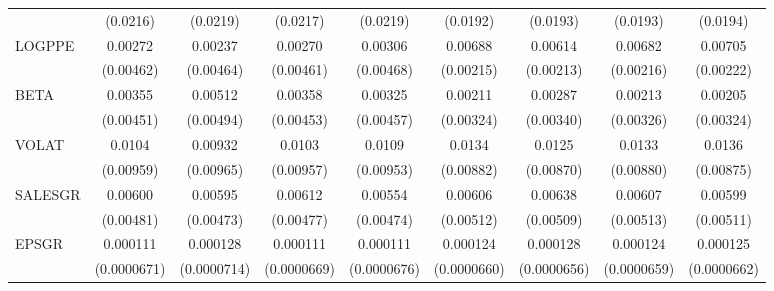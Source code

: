 \begin{table}[htbp]
\begin{tabular}{l*{8}{c}}
                    &    (0.0216)         &    (0.0219)         &    (0.0217)         &    (0.0219)         &    (0.0192)         &    (0.0193)         &    (0.0193)         &    (0.0194)         \\
LOGPPE              &     0.00272         &     0.00237         &     0.00270         &     0.00306         &     0.00688\sym{***}&     0.00614\sym{***}&     0.00682\sym{***}&     0.00705\sym{***}\\
                    &   (0.00462)         &   (0.00464)         &   (0.00461)         &   (0.00468)         &   (0.00215)         &   (0.00213)         &   (0.00216)         &   (0.00222)         \\
BETA                &     0.00355         &     0.00512         &     0.00358         &     0.00325         &     0.00211         &     0.00287         &     0.00213         &     0.00205         \\
                    &   (0.00451)         &   (0.00494)         &   (0.00453)         &   (0.00457)         &   (0.00324)         &   (0.00340)         &   (0.00326)         &   (0.00324)         \\
VOLAT               &      0.0104         &     0.00932         &      0.0103         &      0.0109         &      0.0134         &      0.0125         &      0.0133         &      0.0136         \\
                    &   (0.00959)         &   (0.00965)         &   (0.00957)         &   (0.00953)         &   (0.00882)         &   (0.00870)         &   (0.00880)         &   (0.00875)         \\
SALESGR             &     0.00600         &     0.00595         &     0.00612         &     0.00554         &     0.00606         &     0.00638         &     0.00607         &     0.00599         \\
                    &   (0.00481)         &   (0.00473)         &   (0.00477)         &   (0.00474)         &   (0.00512)         &   (0.00509)         &   (0.00513)         &   (0.00511)         \\
EPSGR               &    0.000111         &    0.000128\sym{*}  &    0.000111         &    0.000111         &    0.000124\sym{*}  &    0.000128\sym{*}  &    0.000124\sym{*}  &    0.000125\sym{*}  \\
                    & (0.0000671)         & (0.0000714)         & (0.0000669)         & (0.0000676)         & (0.0000660)         & (0.0000656)         & (0.0000659)         & (0.0000662)         \\

\end{tabular}
\end{table}
